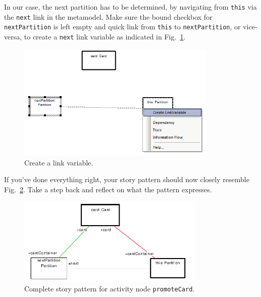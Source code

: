 In our case, the next partition has to be determined, by navigating from
\texttt{this} via the \texttt{next} link in the metamodel.  Make sure the bound
checkbox for \texttt{nextPartition} is left empty and quick link from
\texttt{this} to \texttt{nextPartition}, or vice-versa, to create a
\texttt{next} link variable as indicated in
Fig.~\ref{fig:sdm_check_link_variable}.

\begin{figure}[htbp]
\begin{center}
  \includegraphics[width=0.85\textwidth]{pics/sdmBilder/check/sdm26}
  \caption{Create a link variable.}
  \label{fig:sdm_check_link_variable}
\end{center}
\end{figure}

If you've done everything right, your story pattern should now closely resemble
Fig.~\ref{fig:sdm_check_complete_activity_node}.  Take a step back and reflect
on what the pattern expresses.

\begin{figure}[htbp]
\begin{center}
  \includegraphics[width=0.8\textwidth]{pics/sdmBilder/check/sdm30}
  \caption{Complete story pattern for activity node \texttt{promoteCard}.}
  \label{fig:sdm_check_complete_activity_node}
\end{center}
\end{figure}

